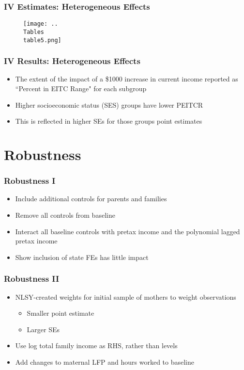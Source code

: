 \documentclass{beamer}
\begin{document}
\begin{frame}
\frametitle{IV Estimates: Heterogeneous Effects}
\begin{figure}
	\texttt{[image: ..\\Tables\\table5.png]} %
\end{figure}
\end{frame}

\begin{frame}
\frametitle{IV Results: Heterogeneous Effects}
\begin{itemize}
	\item The extent of the impact of a \$1000 increase in current income reported as ``Percent in EITC Range" for each subgroup
	\item Higher socioeconomic status (SES) groups have lower PEITCR
	\item This is reflected in higher SEs for those groups point estimates
\end{itemize}
\end{frame}


\section{Robustness}


\begin{frame}
\frametitle{Robustness I}
\begin{itemize}
	\item Include additional controls for parents and families
	\item Remove all controls from baseline
	\item Interact all baseline controls with pretax income and the polynomial lagged pretax income
	\item Show inclusion of state FEs has little impact
\end{itemize}
\end{frame}

\begin{frame}
\frametitle{Robustness II}
\begin{itemize}
	\item NLSY-created weights for initial sample of mothers to weight observations
	\begin{itemize}
		\item Smaller point estimate
		\item Larger SEs
	\end{itemize}
	\item Use log total family income as RHS, rather than levels
	\item Add changes to maternal LFP and hours worked to baseline
\end{itemize}
\end{frame}
\end{document}

